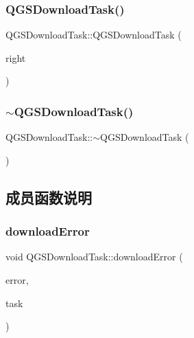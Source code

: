 \subsubsection{\texorpdfstring{Q\+G\+S\+Download\+Task()}{QGSDownloadTask()}\hspace{0.1cm}{\footnotesize\ttfamily [4/4]}}
{\footnotesize\ttfamily Q\+G\+S\+Download\+Task\+::\+Q\+G\+S\+Download\+Task (\begin{DoxyParamCaption}\item[{\mbox{\hyperlink{class_q_g_s_download_task}{Q\+G\+S\+Download\+Task}} \&\&}]{right }\end{DoxyParamCaption})\hspace{0.3cm}{\ttfamily [delete]}}

\mbox{\label{class_q_g_s_download_task_abe196b5c26896f9c162a3047ceb9dc4a}} 
\subsubsection{\texorpdfstring{$\sim$\+Q\+G\+S\+Download\+Task()}{~QGSDownloadTask()}}
{\footnotesize\ttfamily Q\+G\+S\+Download\+Task\+::$\sim$\+Q\+G\+S\+Download\+Task (\begin{DoxyParamCaption}{ }\end{DoxyParamCaption})\hspace{0.3cm}{\ttfamily [virtual]}}



\subsection{成员函数说明}
\mbox{\label{class_q_g_s_download_task_ab01c215f547152f0b419e9e1d92e7488}} 
\subsubsection{\texorpdfstring{download\+Error}{downloadError}}
{\footnotesize\ttfamily void Q\+G\+S\+Download\+Task\+::download\+Error (\begin{DoxyParamCaption}\item[{\mbox{\hyperlink{class_q_g_s_network_error}{Q\+G\+S\+Network\+Error}}}]{error,  }\item[{\mbox{\hyperlink{class_q_g_s_task}{Q\+G\+S\+Task}} $\ast$}]{task }\end{DoxyParamCaption})\hspace{0.3cm}{\ttfamily [signal]}}

